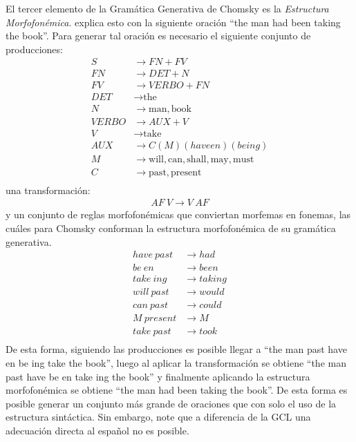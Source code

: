 El tercer elemento de la Gramática Generativa de Chomsky es la \textit{Estructura Morfofonémica}. \cite{chomsky1956three} explica esto con la siguiente oración ``the man had been taking the book''. Para generar tal oración es necesario el siguiente conjunto de producciones:
\begin{align*}
	S &\rightarrow FN + FV \\
	FN &\rightarrow DET + N \\
	FV &\rightarrow VERBO + FN \\
	DET &\rightarrow \mbox{the}\\
	N &\rightarrow \mbox{man}, \mbox{book}\\
	VERBO &\rightarrow AUX + V \\
	V &\rightarrow \mbox{take}\\
	AUX &\rightarrow C(M)(have en)(be ing)\\
	M &\rightarrow \mbox{will}, \mbox{can}, \mbox{shall}, \mbox{may}, \mbox{must}\\
	C &\rightarrow \mbox{past}, \mbox{present}\\
\end{align*}
una transformación:
\begin{align*}
	AF \ V \rightarrow V \ AF
\end{align*}
y un conjunto de reglas morfofonémicas que conviertan morfemas en fonemas, las cuáles para Chomsky conforman la estructura morfofonémica de su gramática generativa.
\begin{align*}
	have\ past &\rightarrow had \\
	be\ en &\rightarrow been \\
	take\ ing &\rightarrow taking \\
	will\ past &\rightarrow would\\
	can\ past &\rightarrow could\\
	M \ present &\rightarrow M \\
	take \ past &\rightarrow took\\
\end{align*}
De esta forma, siguiendo las producciones es posible llegar a ``the man past have en be ing take the book'', luego al aplicar la transformación se obtiene ``the man past have be en take ing the book'' y finalmente aplicando la estructura morfofonémica se obtiene ``the man had been taking the book''. De esta forma es posible generar un conjunto más grande de oraciones que con solo el uso de la estructura sintáctica. Sin embargo, note que a diferencia de la GCL una adecuación directa al español no es posible.

